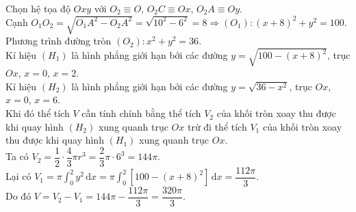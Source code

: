 \begin{bt}
	\loigiai
	{
		Chọn hệ tọa độ $Oxy$ với $O_2 \equiv O$, $O_2 C \equiv Ox$, $O_2 A \equiv Oy$.\\
		Cạnh $O_1 O_2=\sqrt{O_1 A^2-O_2 A^2}=\sqrt{10^2-6^2}=8 \Rightarrow(O_1)\colon (x+8)^2+y^2=100$.\\
		Phương trình đường tròn $(O_2)\colon x^2+y^2=36$.\\
		Kí hiệu $(H_1)$ là hình phẳng giới hạn bởi các đường $y=\sqrt{100-(x+8)^2}$, trục $Ox$, $x=0$, $x=2$.\\	
		Kí hiệu $(H_2)$ là hình phẳng giới hạn bởi các đường $y=\sqrt{36-x^2}$, trục $Ox$, $x=0$, $x=6$.\\
		Khi đó thể tích $V$ cần tính chính bằng thể tích $V_2$ của khối tròn xoay thu được khi quay hình $(H_2)$ xung quanh trục $Ox$ trừ đi thể tích $V_1$ của khối tròn xoay thu được khi quay hình $(H_1)$ xung quanh trục $Ox$.\\
		Ta có $V_2=\dfrac{1}{2} \cdot \dfrac{4}{3} \pi r^3=\dfrac{2}{3} \pi \cdot 6^3=144 \pi$.\\
		Lại có $V_1=\pi \displaystyle\int_0^2 y^2 \mathrm{\,d}x=\pi \displaystyle\int_0^2 [100-(x+8)^2] \mathrm{\,d}x=\dfrac{112 \pi}{3}$.\\
		Do đó $V=V_2-V_1=144 \pi-\dfrac{112 \pi}{3}=\dfrac{320 \pi}{3}$.
	}
\end{bt}

